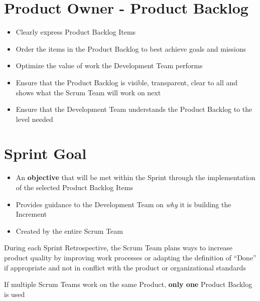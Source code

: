 \documentclass[a4paper,11pt,twocolumn]{article}
\begin{document}
\section*{Product Owner - Product Backlog}
\begin{itemize}
	\item Clearly express Product Backlog Items
	\item Order the items in the Product Backlog to best achieve goals and missions
	\item Optimize the value of work the Development Team performs
	\item Ensure that the Product Backlog is visible, transparent, clear to all and shows what the Scrum Team will work on next
	\item Ensure that the Development Team understands the Product Backlog to the level needed
\end{itemize}

\section*{Sprint Goal}
\begin{itemize}
	\item An \textbf{objective} that will be met within the Sprint through the implementation of the selected Product Backlog Items
	\item Provides guidance to the Development Team on \textit{why} it is building the Increment
	\item Created by the entire Scrum Team
\end{itemize}

\begin{tcolorbox}[colback=black!8!white,colframe=gray!50!black,title=Note,sharp corners,fonttitle=\normalsize\bfseries,fontupper=\normalsize,left=0.7em,right=0.7em]
	During each Sprint Retrospective, the Scrum Team plans ways to increase product quality by improving work processes or adapting the definition of ``Done'' if appropriate and not in conflict with the product or organizational standards
\end{tcolorbox}


\begin{tcolorbox}[colback=black!8!white,colframe=gray!50!black,title=Note,sharp corners,fonttitle=\normalsize\bfseries,fontupper=\normalsize,left=0.7em,right=0.7em]
	If multiple Scrum Teams work on the same Product, \textbf{only one} Product Backlog is used
\end{tcolorbox}
\end{document}
